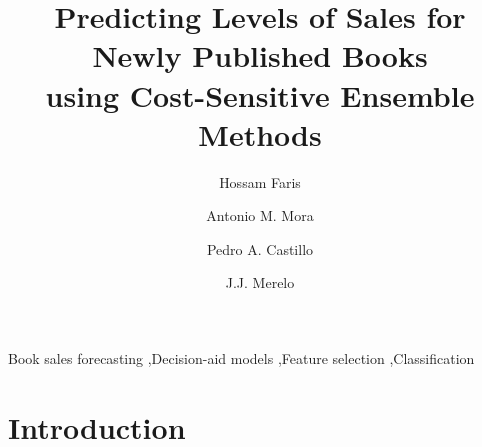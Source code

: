 \documentclass[a4paper,10pt,onecolumn,preprint,3p]{elsarticle}
\begin{document}

\title{Predicting Levels of Sales for Newly Published Books \\
using Cost-Sensitive Ensemble Methods}


\author[abd]{Hossam Faris}
\author[ugrtstc]{Antonio M. Mora}
\author[ugratc]{Pedro A. Castillo}
\author[ugratc]{J.J. Merelo}


\address[abd]{Business Information Technology Department, King Abdullah II School for Information Technology \\
The University of Jordan, Amman, Jordan}
\address[ugrtstc]{Department of Signal Theory, Telematics and Communications, ETSIIT and CITIC \\
University of Granada, Granada, Spain}
\address[ugratc]{Department of Computer Architecture and Computer Technology, ETSIIT and CITIC \\
University of Granada, Granada, Spain}

\maketitle

\begin{abstract}

\end{abstract}


\begin{keyword}
Book sales forecasting \sep Decision-aid models \sep Feature selection \sep Classification  
\end{keyword}




\section{Introduction}
\label{sec:intro}
\end{document}
